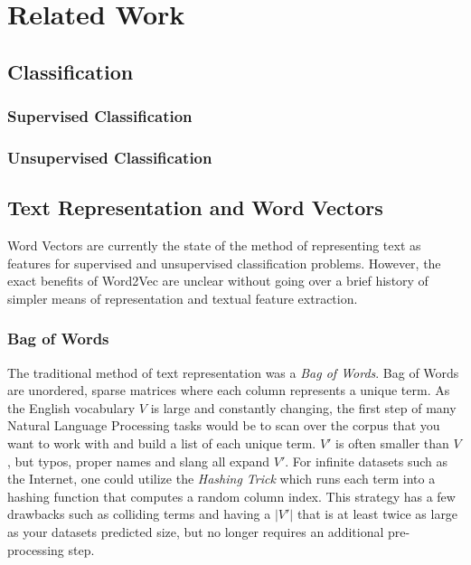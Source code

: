 \chapter{Related Work}\label{sec:related}

\section{Classification}

\subsection{Supervised Classification}

\subsection{Unsupervised Classification}

\section{Text Representation and Word Vectors}

Word Vectors \cite{word2vec} are currently the state of the method of representing text as features for supervised and unsupervised classification problems. However, the exact benefits of Word2Vec are unclear without going over a brief history of simpler means of representation and textual feature extraction.

\subsection{Bag of Words}

\par{
The traditional method of text representation was a \textit{Bag of Words}. Bag of Words are unordered, sparse matrices where each column represents a unique term. As the English vocabulary $V$ is large and constantly changing, the first step of many Natural Language Processing tasks would be to scan over the corpus that you want to work with and build a list of each unique term. $V'$ is often smaller than $V$, but typos, proper names and slang all expand $V'$. For infinite datasets such as the Internet, one could utilize the \textit{Hashing Trick} \cite{} which runs each term into a hashing function that computes a random column index. This strategy has a few drawbacks such as colliding terms and having a $|V'|$ that is at least twice as large as your datasets predicted size, but no longer requires an additional pre-processing step.
}

